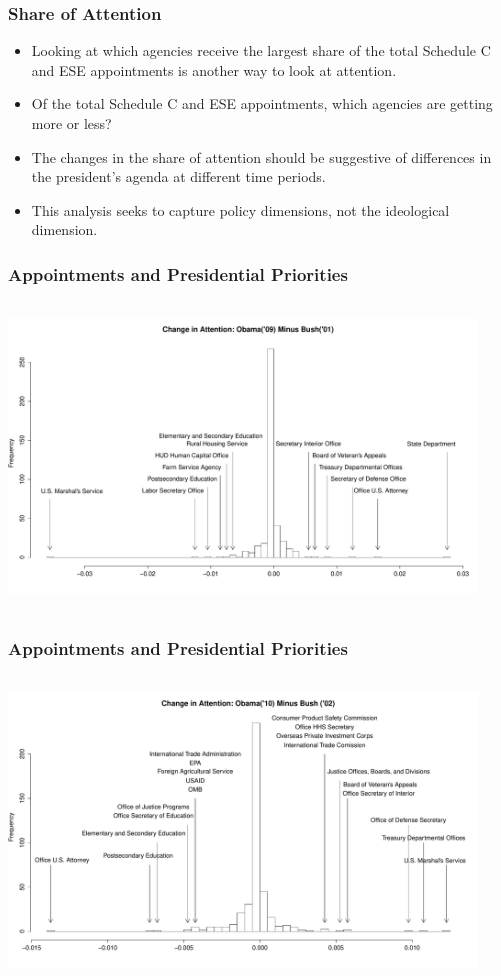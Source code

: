 \documentclass{beamer}
\begin{document}
\begin{frame}[fragile]
\frametitle{Share of Attention}

\begin{itemize}\addtolength{\itemsep}{1\baselineskip}
\item Looking at which agencies receive the largest share of the total Schedule C and ESE appointments is another way to look at attention. 
\item Of the total Schedule C and ESE appointments, which agencies are getting more or less?
\item The changes in the share of attention should be suggestive of differences in the president's agenda at different time periods.
\item This analysis seeks to capture policy dimensions, not the ideological dimension.

\end{itemize}
\end{frame}

\begin{frame}[fragile]
\frametitle{Appointments and Presidential Priorities}
\includegraphics[height=3.2in,width=4.9in]{AttentionChange01to09.pdf}
\end{frame}

\begin{frame}[fragile]
\frametitle{Appointments and Presidential Priorities}
\includegraphics[height=3.2in,width=4.9in]{AttentionChange02to10.pdf}
\end{frame}
\end{document}

